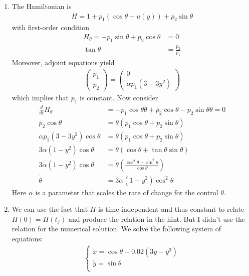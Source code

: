 \documentclass[12pt]{article}
\begin{document}
\begin{problem}[2]
\begin{enumerate}[label=(\alph*)]
\item The Hamiltonian is
\begin{align*}
	H=1+p_1(\cos \theta + u(y)) + p_2 \sin \theta
\end{align*}
with first-order condition
\begin{align*}
	H_{ \theta} = - p_1 \sin \theta + p_2 \cos \theta &= 0\\
	\tan \theta &= \frac{p_2}{ p_1} 
\end{align*}
Moreover, adjoint equations yield
\begin{align*}
	\begin{pmatrix} \dot{p_1}\\ \dot{p_2} \end{pmatrix} = \begin{pmatrix} 0\\ \alpha p_1 (3-3y^2) \end{pmatrix} 
\end{align*}
which implies that $ p_1$ is constant. Now consider
\begin{align*}
	\frac{d}{dt} H_{ \theta} &= -p_1 \cos \theta \dot{\theta} + \dot{p_2} \cos \theta - p_2 \sin \theta \dot{\theta} =0\\
	\dot{p_2} \cos \theta &= \dot{\theta} (p_1 \cos \theta+ p_2 \sin \theta)\\
	\alpha p_1 (3-3y^2) \cos \theta &=  \dot{\theta} (p_1 \cos \theta + p_2 \sin \theta) \\
	3 \alpha (1-y^2) \cos \theta &=  \dot{\theta} (\cos \theta + \tan \theta \sin \theta) \\
	3 \alpha (1-y^2) \cos \theta &=  \dot{\theta} (\frac{\cos^2 \theta + \sin^2 \theta}{ \cos \theta}) \\
	\dot{\theta} &= 3 \alpha(1-y^2) \cos^2 \theta 
\end{align*}
Here $ \alpha$ is a parameter that scales the rate of change for the control $ \theta$.
\item We can use the fact that $ H$ is time-independent and thus constant to relate  $ H(0)=H(t_f)$ and produce the relation in the hint. But I didn't use the relation for the numerical solution. We solve the following system of equations:
 \begin{align*}
\begin{cases}
	\dot{x} = \cos \theta - 0.02(3y-y^3)\\
	\dot{y} = \sin \theta\\

\end{cases}
\end{align*}
\end{enumerate}
\end{problem}
\end{document}

